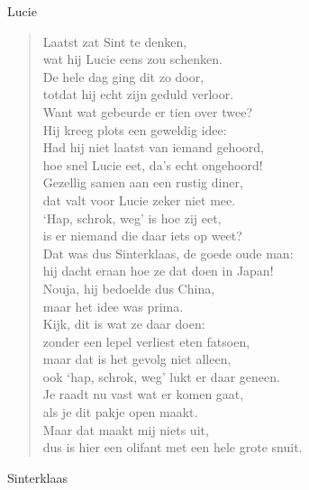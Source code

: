 \documentclass[12pt]{brief}
\date{4 december 2004}
\begin{document}
\begin{letter}{Lucie}

\opening{}


\begin{verse}

Laatst zat Sint te denken,\\
wat hij Lucie eens zou schenken.\\
De hele dag ging dit zo door,\\
totdat hij echt zijn geduld verloor.\\[0.5em]

Want wat gebeurde er tien over twee?\\
Hij kreeg plots een geweldig idee:\\
Had hij niet laatst van iemand gehoord,\\
hoe snel Lucie eet, da's echt ongehoord!\\[0.5em]

Gezellig samen aan een rustig diner,\\
dat valt voor Lucie zeker niet mee.\\
`Hap, schrok, weg' is hoe zij eet,\\
is er niemand die daar iets op weet?\\[0.5em]

Dat was dus Sinterklaas, de goede oude man:\\
hij dacht eraan hoe ze dat doen in Japan!\\
Nouja, hij bedoelde dus China,\\
maar het idee was prima.\\[0.5em]

Kijk, dit is wat ze daar doen:\\
zonder een lepel verliest eten fatsoen,\\
maar dat is het gevolg niet alleen,\\
ook `hap, schrok, weg' lukt er daar geneen.\\[0.5em]

Je raadt nu vast wat er komen gaat,\\
als je dit pakje open maakt.\\
Maar dat maakt mij niets uit,\\
dus is hier een olifant met een hele grote snuit.\\

\end{verse}


Sinterklaas


\closing{}

\end{letter}
\end{document}
